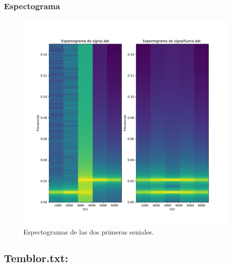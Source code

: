 \documentclass[11pt,letterpaper]{exam}
\begin{document}
\subsubsection{Espectograma}
\begin{figure}[H]
    \centering
    \includegraphics[width=1.1\textwidth]{espectograma.pdf}
    \caption{Espectogramas de las dos primeras seniales.}
    \label{fig:my_label}
\end{figure}
\subsection{Temblor.txt:}
\end{document}
